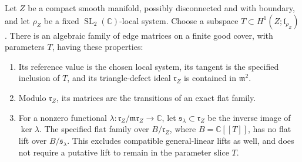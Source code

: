 \begin{lemma}
\label{def:equation-chart}
Let \(Z\) be a compact smooth manifold, possibly disconnected and
with boundary, and let \(\rho_Z\) be a fixed
\(\operatorname{SL}_2(\mathbb C)\)-local system.  Choose a subspace
\(T\subset H^1(Z;\mathfrak l_{\rho_Z})\).
There is an algebraic family of edge matrices on a finite good
cover, with parameters \(T\), having these properties:
\begin{enumerate}
\item Its reference value is the chosen local system, its tangent
      is the specified inclusion of \(T\), and its triangle-defect
      ideal \(\mathfrak r_Z\) is contained in \(\mathfrak m^2\).
\item Modulo \(\mathfrak r_Z\), its matrices are the transitions of
      an exact flat family.
\item For a nonzero functional
      \(\lambda:\mathfrak r_Z/\mathfrak m\mathfrak r_Z\to\mathbb C\),
      let \(\mathfrak s_\lambda\subset\mathfrak r_Z\) be the inverse image
      of \(\ker\lambda\).  The specified flat family over
      \(B/\mathfrak r_Z\), where \(B=\mathbb C[[T]]\), has no flat lift
      over \(B/\mathfrak s_\lambda\).  This excludes compatible
      general-linear lifts as well, and does not require a putative
      lift to remain in the parameter slice \(T\).
\end{enumerate}
\end{lemma}

